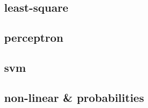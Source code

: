 \documentclass[cheatsheet.tex]{subfiles}
\begin{document}
\subsection{least-square}
\lipsum[1-2]
\subsection{perceptron}
\lipsum[1-2]
\subsection{svm}
\lipsum[1-2]
\subsection{non-linear \& probabilities}
\lipsum[1-2]
\end{document}

